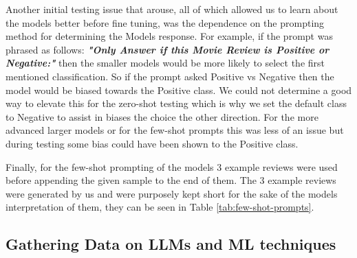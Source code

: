 \documentclass[10pt,twocolumn,letterpaper]{article}
\begin{document}
Another initial testing issue that arouse, all of which allowed us to learn about the models better before fine tuning, was the dependence on the prompting method for determining the Models response. For example, if the prompt was phrased as follows: \textit{\textbf{"Only Answer if this Movie Review is Positive or Negative:"}} then the smaller models would be more likely to select the first mentioned classification. So if the prompt asked Positive vs Negative then the model would be biased towards the Positive class. We could not determine a good way to elevate this for the zero-shot testing which is why we set the default class to Negative to assist in biases the choice the other direction. For the more advanced larger models or for the few-shot prompts this was less of an issue but during testing some bias could have been shown to the Positive class. 

Finally, for the few-shot prompting of the models 3 example reviews were used before appending the given sample to the end of them. The 3 example reviews were generated by us and were purposely kept short for the sake of the models interpretation of them, they can be seen in Table \ref{tab:few-shot-prompts}.

\begin{table}
\begin{center}
\end{center}
\caption{Few-shot prompts used to test default SmolLM models.}
\label{tab:few-shot-prompts}
\end{table}


\subsection{Gathering Data on LLMs and ML techniques}
\end{document}
